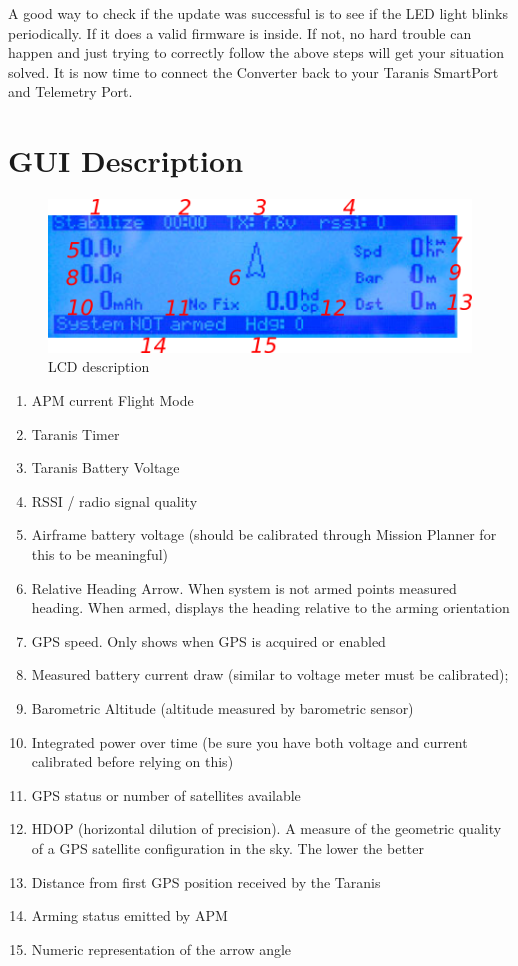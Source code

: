 \documentclass[english]{article}
\begin{document}
A good way to check if the update was successful is to see if the LED light blinks periodically. If it does a valid firmware is inside. If not, no hard trouble can happen and just trying to correctly follow the above steps will get your situation solved. It is now time to connect the Converter back to your Taranis SmartPort and Telemetry Port.

\section{GUI Description}

\begin{figure}[h!]
	\centering
	\includegraphics{LCD Description}
	\caption{LCD description}
\end{figure}

\begin{enumerate}

\item APM current Flight Mode
\item Taranis Timer
\item Taranis Battery Voltage
\item RSSI / radio signal quality
\item Airframe battery voltage (should be calibrated through Mission Planner for this to be meaningful)
\item Relative Heading Arrow. When system is not armed points measured heading. When armed, displays the heading relative to the arming orientation
\item GPS speed. Only shows when GPS is acquired or enabled
\item Measured battery current draw (similar to voltage meter must be calibrated);
\item Barometric Altitude (altitude measured by barometric sensor)
\item Integrated power over time (be sure you have both voltage and current calibrated before relying on this)
\item GPS status or number of satellites available
\item HDOP (horizontal dilution of precision). A measure of the geometric quality of a GPS satellite configuration in the sky. The lower the better
\item Distance from first GPS position received by the Taranis
\item Arming status emitted by APM
\item Numeric representation of the arrow angle

\end{enumerate}
\end{document}
